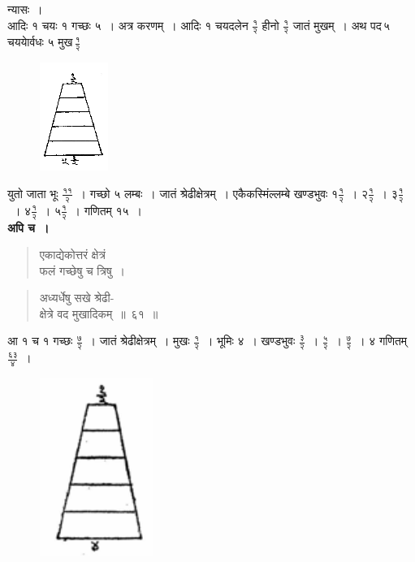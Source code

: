 \documentclass[11pt, openany]{book}
\begin{document}
न्यासः~। \\

\vspace{-4mm}
आदिः १ चयः १ गच्छः ५~। अत्र करणम्~। आदिः १ चयदलेन $\frac{\mbox{१}}{\mbox{२}}$ हीनो
$\frac{\mbox{१}}{\mbox{२}}$ जातं मुखम्~। अथ पद\textendash \,५\textendash \,चययेार्वधः ५ मुख\textendash \,$\frac{\mbox{१}}{\mbox{२}}$\textendash 
\vspace{-2mm}

\begin{figure}[h!]
    \centering
    \includegraphics[scale=0.85]{graphics/capture87.png}
\end{figure}
\vspace{-2mm}

\noindent युतो जाता भूः $\frac{\mbox{११}}{\mbox{२}}$~। गच्छो ५ लम्बः~। जातं श्रेढीक्षेत्रम्~। एकैकस्मिंल्लम्बे खण्डभुवः १$\frac{\mbox{१}}{\mbox{२}}$~। २$\frac{\mbox{१}}{\mbox{२}}$~। ३$\frac{\mbox{१}}{\mbox{२}}$~। ४$\frac{\mbox{१}}{\mbox{२}}$~। ५$\frac{\mbox{१}}{\mbox{२}}$~। गणितम् १५~।\\

 \textbf{अपि च~।} 
\begin{quote}
    \bqt 
     एकाद्येकोत्तरं क्षेत्रं \\
     फलं गच्छेषु च त्रिषु~।
\end{quote}
\newpage
\begin{quote}
    \bqt 
अध्यर्धेषु सखे श्रेढी-\\
क्षेत्रे वद मुखादिकम्~॥~६१~॥
\end{quote}

आ १ च १ गच्छः $\frac{\mbox{७}}{\mbox{२}}$~। जातं श्रेढीक्षेत्रम्~। मुखः $\frac{\mbox{१}}{\mbox{२}}$~। भूमिः ४~। खण्डभुवः $\frac{\mbox{३}}{\mbox{२}}$~। $\frac{\mbox{५}}{\mbox{२}}$~। $\frac{\mbox{७}}{\mbox{२}}$~। ४ गणितम् $\frac{\mbox{६३}}{\mbox{४}}$~।
\vspace{-2mm}

\begin{figure}[h!]
    \centering
    \includegraphics[scale=0.4]{graphics/capture87_1.png}
\end{figure}
\end{document}
